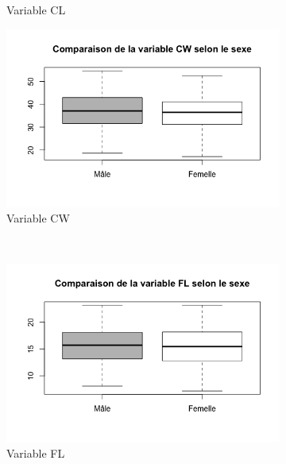 \documentclass[a4paper,11pt]{report}
\begin{document}
\begin{figure}[H]
\begin{subfigure}[b]{0.3\linewidth}
		\caption{\scriptsize Variable CL}
		\label{fig:1_2_1_sex_cl}
	\end{subfigure}%
	\begin{subfigure}[b]{0.3\linewidth}
		\centering
		\captionsetup{justification=centering, margin=1cm}
		\includegraphics[width=1\linewidth]{img/1-2-1-sex-cw.png}
		\caption{\scriptsize Variable CW}
		\label{fig:1_2_1_sex_cw}
	\end{subfigure}%
	\\
	\begin{subfigure}[b]{0.3\linewidth}
		\centering
		\captionsetup{justification=centering, margin=1cm}
		\includegraphics[width=1\linewidth]{img/1-2-1-sex-fl.png}
		\caption{\scriptsize Variable FL}
		\label{fig:1_2_1_sex_fl}
	\end{subfigure}%
	\begin{subfigure}[b]{0.3\linewidth}
		\centering
		\captionsetup{justification=centering, margin=1cm}

\end{subfigure}
\end{figure}
\end{document}
